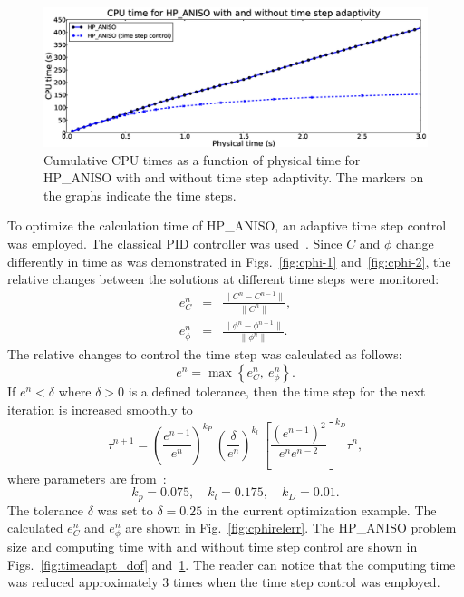 \begin{figure}[!ht]
  \begin{centering}
  \includegraphics[width=\columnwidth]{timeadapt_cpu}
  \caption{\label{fig:timeadapt_cpu} Cumulative CPU times
  as a function of physical time for HP\_ANISO with and without
  time step adaptivity. The markers on the graphs indicate the
  time steps.}
  \end{centering}
\end{figure}

To optimize the calculation time of HP\_ANISO, an adaptive time step control was employed.
The classical PID controller was used~\cite{valli2002control,dubcova2010space}.
Since $C$ and $\phi$ change differently in time as was demonstrated in Figs.~\ref{fig:cphi-1}
and~\ref{fig:cphi-2}, the relative changes between the solutions at different
time steps were monitored:
\begin{eqnarray}
  e_C^n & = & \frac{\lVert C^n-C^{n-1}\rVert}{\lVert C^n \rVert},\\
  e_\phi^n & = & \frac{\lVert \phi^n-\phi^{n-1}\rVert}{\lVert \phi^n \rVert}.
\end{eqnarray}
The relative changes to control the time step was calculated as follows:
\begin{equation}
  e^n=\max\left\{ e_C^n,\ e_\phi^n \right\}.
\end{equation}
If $e^n < \delta$ where $\delta>0$ is a defined tolerance, then the time
step for the next iteration is increased smoothly to
\begin{equation}
  \tau^{n+1}=\left( \frac{e^{n-1}}{e^n} \right)^{k_P}\ \left( \frac{\delta}{e^n} \right)^{k_l}\
  \left[ \frac{\left( e^{n-1} \right)^2}{e^n e^{n-2}} \right]^{k_D} \tau^n,
\end{equation}
where parameters are from~\cite{valli2002control}:
\begin{equation}
  k_p=0.075,\quad k_l=0.175,\quad k_D=0.01.
\end{equation}
The tolerance $\delta$ was set to $\delta=0.25$ in the current optimization
example. The calculated $e_C^n$ and $e_\phi^n$ are shown in Fig.~\ref{fig:cphirelerr}.
The HP\_ANISO problem size and computing time with and without time step control
are shown in Figs.~\ref{fig:timeadapt_dof} and~\ref{fig:timeadapt_cpu}. The reader
can notice that the computing time was reduced approximately 3 times when the time
step control was employed.

